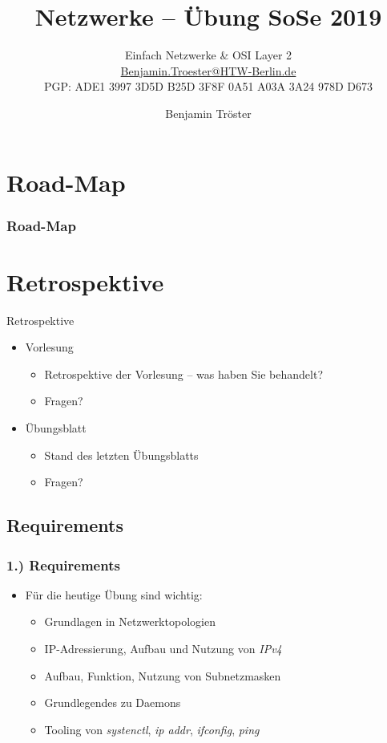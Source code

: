 \documentclass[xcolor=dvipsnames, aspectratio=169]{beamer}
\begin{document}

\title{Netzwerke -- Übung SoSe 2019}
\subtitle{Einfach Netzwerke \& OSI Layer 2\\
		\href{mailto:Benjamin.Troester@HTW-Berlin.de}{Benjamin.Troester@HTW-Berlin.de}\\
		PGP: ADE1 3997 3D5D B25D 3F8F 0A51 A03A 3A24 978D D673 }
\author{Benjamin Tröster}

\date{}

\begin{frame}
\titlepage

\end{frame}

\section*{Road-Map}
\begin{frame}
\frametitle{Road-Map}
\begin{multicols}{2}
  \tableofcontents
\end{multicols}
\end{frame}

\section{Retrospektive}
\begin{frame}{Retrospektive}
\begin{itemize}
	\item Vorlesung
	\begin{itemize}
		\item Retrospektive der Vorlesung -- was haben Sie behandelt?
		\item Fragen?
	\end{itemize}
	\item Übungsblatt
	\begin{itemize}
		\item Stand des letzten Übungsblatts
		\item Fragen?
	\end{itemize}
\end{itemize}
\end{frame}


\subsection{Requirements}
\begin{frame}
\frametitle{1.) Requirements}
	\begin{itemize}
		\item Für die heutige Übung sind wichtig:
		\begin{itemize}
			\item Grundlagen in Netzwerktopologien
			\item IP-Adressierung, Aufbau und Nutzung von \emph{IPv4}
			\item Aufbau, Funktion, Nutzung von Subnetzmasken
			\item Grundlegendes zu Daemons
			\item Tooling von \emph{systenctl}, \emph{ip addr}, \emph{ifconfig}, \emph{ping}
		\end{itemize}
	\end{itemize}
\end{frame}
\end{document}
